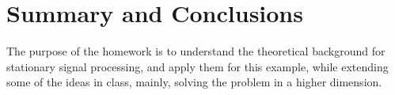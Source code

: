 \documentclass{article}
\begin{document}


\newpage
\section{Summary and Conclusions}
The purpose of the homework is to understand the theoretical background for stationary signal processing, and apply them for this example, while extending some of the ideas in class, mainly, solving the problem in a higher dimension. 

\printbibliography
\end{document}
